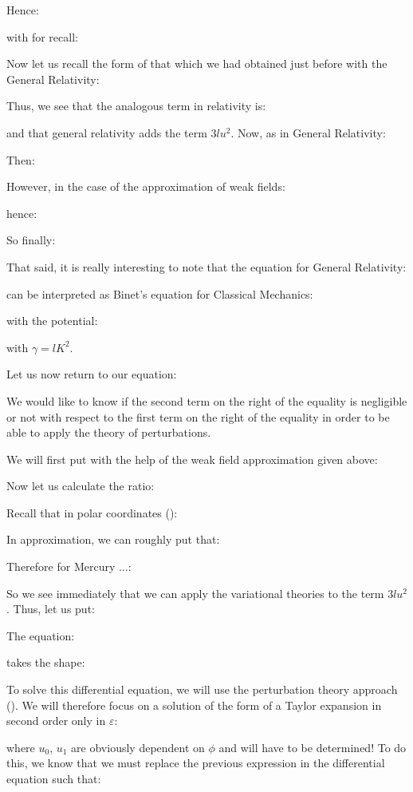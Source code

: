 	Hence:
	
	with for recall:
	
	Now let us recall the form of that which we had obtained just before with the General Relativity:
	
	Thus, we see that the analogous term in relativity is:
	
	and that general relativity adds the term $3lu^2$. Now, as in General Relativity:
	
	Then:
	
	However, in the case of the approximation of weak fields:
	
	hence:
	
	So finally:
	
	That said, it is really interesting to note that the equation for General Relativity:
	
	can be interpreted as Binet's equation for Classical Mechanics:
	
	with the potential:
	
	with $\gamma=lK^2$.
	
	Let us now return to our equation:
	
	We would like to know if the second term on the right of the equality is negligible or not with respect to the first term on the right of the equality in order to be able to apply the theory of perturbations.

	We will first put with the help of the weak field approximation given above:
	
	Now let us calculate the ratio:
	
	Recall that in polar coordinates ():
	
	In approximation, we can roughly put that:
	
	Therefore for Mercury ...:
	
	So we see immediately that we can apply the variational theories to the term $3lu^2$. Thus, let us put:
	
	The equation:
	
	takes the shape:
	
	To solve this differential equation, we will use the perturbation theory approach (). We will therefore focus on a solution of the form of a Taylor expansion in second order only in $\varepsilon$:
	
	where $u_0$, $u_1$ are obviously dependent on $\phi$ and will have to be determined! To do this, we know that we must replace the previous expression in the differential equation such that:
	
